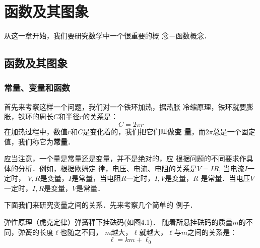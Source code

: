 \chapter{函数及其图象}

从这一章开始，我们要研究数学中一个很重要的概
念－函数概念．
\section{函数及其图象}
\subsection{常量、变量和函数}
首先来考察这样一个问题，我们对一个铁环加热，据热胀
冷缩原理，铁环就要膨胀，铁环的周长$C$和半径$r$的关系是：
\[C=2\pi r\]
在加热过程中，数值$r$和$C$是变化着的，我们把它们叫做\textbf{变
量}，而$2\pi$总是一个固定值，我们称它为\textbf{常量}．

应当注意，一个量是常量还是变量，并不是绝对的，应
根据问题的不同要求作具体的分析．例如，根据欧姆定
律，电压、电流、电阻的关系是$V=IR$, 当电流$I$一定时，
$V,R$是变量，$I$是常量，当电阻$R$一定时，$I,V$是变量，$R$
是常量．当电压$V$一定时，$I,R$是变量，$V$是常量．

下面我们来研究变量之间的关系．先来考察几个简单的
例子．


\begin{example}
    弹性原理（虎克定律）弹簧秤下挂砝码(如图4.1)．
随着所悬挂砝码的质量$m$的不同，弹簧的长度$\ell$也随之不同，
$m$越大，$\ell$就越大，$\ell$与$m$之间的关系是：
\[\ell=km+\ell_0\]
\end{example}

\begin{figure}[htp]
    \centering
 \caption{}
\end{figure}

